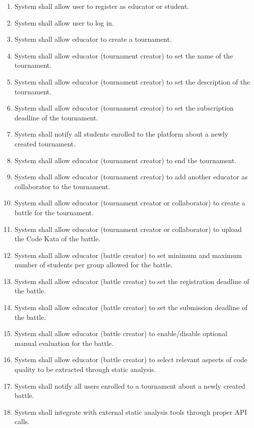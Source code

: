 \begin{enumerate}[label=$\bullet$ \textbf{R\arabic*:}]
    \item System shall allow user to register as educator or student.
    \item System shall allow user to log in.
    \item System shall allow educator to create a tournament.
    \item System shall allow educator (tournament creator) to set the name of the tournament.
    \item System shall allow educator (tournament creator) to set the description of the tournament.
    \item System shall allow educator (tournament creator) to set the subscription deadline of the tournament.
    \item System shall notify all students enrolled to the platform about a newly created tournament.
    \item System shall allow educator (tournament creator) to end the tournament.
    \item System shall allow educator (tournament creator) to add another educator as collaborator to the tournament.
    \item System shall allow educator (tournament creator or collaborator) to create a battle for the tournament.
    \item System shall allow educator (tournament creator or collaborator) to upload the Code Kata of the battle.
    \item System shall allow educator (battle creator) to set minimum and maximum number of students per group allowed for the battle.
    \item System shall allow educator (battle creator) to set the registration deadline of the battle.
    \item System shall allow educator (battle creator) to set the submission deadline of the battle.
    \item System shall allow educator (battle creator) to enable/disable optional manual evaluation for the battle.
    \item System shall allow educator (battle creator) to select relevant aspects of code quality to be extracted through static analysis.
    \item System shall notify all users enrolled to a tournament about a newly created battle.
    \item System shall integrate with external static analysis tools through proper API calls.

\end{enumerate}
